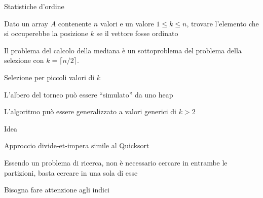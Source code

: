 \begin{frame}{Statistiche d'ordine}

\vspace{-9pt}
\begin{myboxtitle}[Selezione]
Dato un array $A$ contenente $n$ valori e un valore $1 \leq k \leq n$, 
trovare l'elemento che si occuperebbe la posizione $k$ se il vettore fosse ordinato
\end{myboxtitle}

\begin{myboxtitle}[Mediana]
Il problema del calcolo della mediana è un sottoproblema del problema
della selezione con $k=\lceil n/2 \rceil$.
\end{myboxtitle}

\end{frame}

\begin{frame}{Selezione per piccoli valori di $k$}

\vspace{-9pt}
\begin{myboxtitle}[Intuizione]
\BIL
\item L'albero del torneo può essere “simulato” da uno heap
\item L'algoritmo può essere generalizzato a valori generici di $k > 2$
\EIL
\end{myboxtitle}

\end{frame}
	
\begin{frame}{Idea}

\vspace{-9pt}
\BIL
\item Approccio divide-et-impera simile al Quicksort
\item Essendo un problema di ricerca, non è necessario cercare in entrambe le partizioni, basta cercare in una sola di esse
\item Bisogna fare attenzione agli indici
\EIL

\end{frame}


